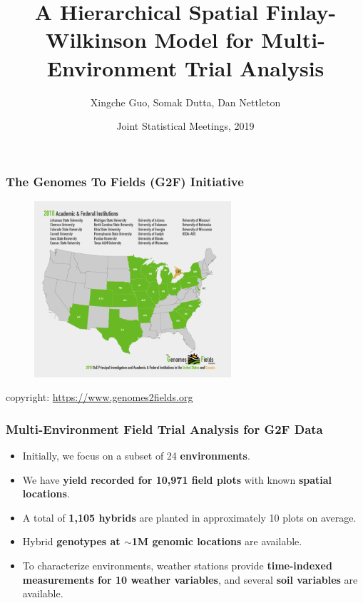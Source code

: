 \documentclass{beamer}
\title[Hierarchical Spatial FW Model for MET]{A Hierarchical Spatial Finlay-Wilkinson Model for Multi-Environment Trial Analysis}
\author[Guo, X., Dutta, S., Nettleton, D.]{Xingche Guo, Somak Dutta, Dan Nettleton}
\institute[ISU]{Dept. of Statistics, Iowa State University}
\date[JSM, 2019]{Joint Statistical Meetings, 2019}
\begin{document}
\begin{frame}
\titlepage
\end{frame}




\begin{frame}
	\frametitle{The Genomes To Fields (G2F) Initiative}
	\begin{figure}[H]
		\centering
		\includegraphics[width = 0.65\textwidth]{g2f_demo.png}
	\end{figure}	
	copyright:	\url{https://www.genomes2fields.org}
\end{frame}


\begin{frame}
	\frametitle{Multi-Environment Field Trial Analysis for G2F Data}
	\begin{itemize}
	\item Initially, we focus on a subset of 24 \textbf{environments}.
	\item We have \textbf{yield recorded for 10,971 field plots} with known \textbf{spatial locations}.
	\item A total of \textbf{1,105 hybrids} are planted in approximately 10 plots on average.
	\item Hybrid \textbf{genotypes at $\sim$1M genomic locations} are available.
	\item To characterize environments, weather stations provide \textbf{time-indexed measurements for 10 weather variables}, and several \textbf{soil variables} are available.
	\end{itemize}	
\end{frame}
\end{document}
